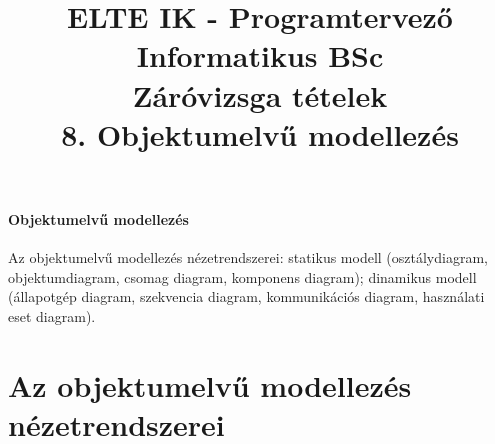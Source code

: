 \documentclass[margin=0px]{article}
\title{\textbf{{\Large ELTE IK - Programtervező Informatikus BSc} \vspace{0.2cm} \\ {\huge Záróvizsga tételek}} \vspace{0.3cm} \\ 8. Objektumelvű modellezés}
\author{}
\date{}
\newenvironment{tetel}[1]{\paragraph{#1 \\}}{}
\begin{document}
\maketitle

\begin{tetel}{Objektumelvű modellezés}
    Az objektumelvű modellezés nézetrendszerei: statikus modell (osztálydiagram, objektumdiagram, csomag diagram, komponens diagram); dinamikus modell (állapotgép diagram, szekvencia diagram, kommunikációs diagram, használati eset diagram).
\end{tetel}

\section{Az objektumelvű modellezés nézetrendszerei}
\end{document}
